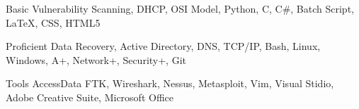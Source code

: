 

\begin{cvhonors}

  \cvhonor
    {Basic} %
    {Vulnerability Scanning, DHCP, OSI Model, Python, C, C\#, Batch Script, \LaTeX, CSS, HTML5} %

  \cvhonor
    {Proficient} %
    {Data Recovery, Active Directory, DNS, TCP/IP, Bash, Linux, Windows, A+, Network+, Security+, Git} %

  \cvhonor
    {Tools} %
    {AccessData FTK, Wireshark, Nessus, Metasploit, Vim, Visual Stidio, Adobe Creative Suite, Microsoft Office} %


\end{cvhonors}